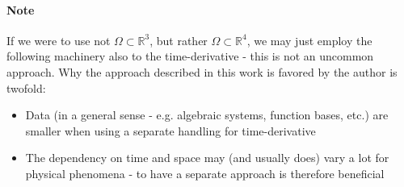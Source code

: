 \paragraph{Note}
If we were to use not $\Omega\subset\mathbb{R}^3$, but rather $\Omega\subset\mathbb{R}^4$, we may just employ the following machinery also to the time-derivative - this is not an uncommon approach. Why the approach described in this work is favored by the author is twofold:
\begin{itemize}
    \item Data (in a general sense - e.g. algebraic systems, function bases, etc.) are smaller when using a separate handling for time-derivative
    \item The dependency on time and space may (and usually does) vary a lot for physical phenomena - to have a separate approach is therefore beneficial
\end{itemize}